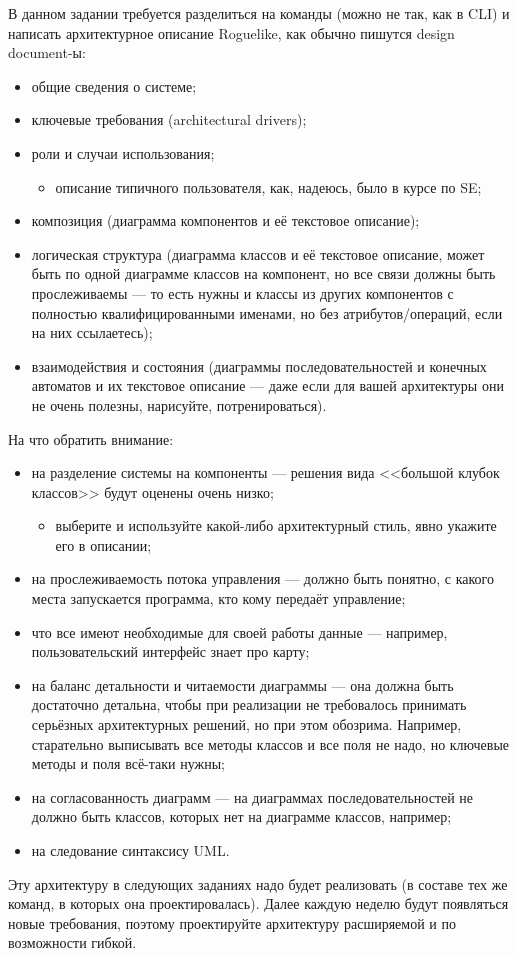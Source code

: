 \documentclass[a5paper]{homework}
\begin{document}
В данном задании требуется разделиться на команды (можно не так, как в CLI) и написать архитектурное описание Roguelike, как обычно пишутся design document-ы:

\begin{itemize}
    \item общие сведения о системе;
    \item ключевые требования (architectural drivers);
    \item роли и случаи использования;
    \begin{itemize}
        \item описание типичного пользователя, как, надеюсь, было в курсе по SE;
    \end{itemize}
    \item композиция (диаграмма компонентов и её текстовое описание);
    \item логическая структура (диаграмма классов и её текстовое описание, может быть по одной диаграмме классов на компонент, но все связи должны быть прослеживаемы --- то есть нужны и классы из других компонентов с полностью квалифицированными именами, но без атрибутов/операций, если на них ссылаетесь);
    \item взаимодействия и состояния (диаграммы последовательностей и конечных автоматов и их текстовое описание --- даже если для вашей архитектуры они не очень полезны, нарисуйте, потренироваться).
\end{itemize}

На что обратить внимание:

\begin{itemize}
    \item на разделение системы на компоненты --- решения вида <<большой клубок классов>> будут оценены очень низко;
    \begin{itemize}
        \item выберите и используйте какой-либо архитектурный стиль, явно укажите его в описании;
    \end{itemize}
    \item на прослеживаемость потока управления --- должно быть понятно, с какого места запускается программа, кто кому передаёт управление;
    \item что все имеют необходимые для своей работы данные --- например, пользовательский интерфейс знает про карту;
    \item на баланс детальности и читаемости диаграммы --- она должна быть достаточно детальна, чтобы при реализации не требовалось принимать серьёзных архитектурных решений, но при этом обозрима. Например, старательно выписывать все методы классов и все поля не надо, но ключевые методы и поля всё-таки нужны;
    \item на согласованность диаграмм --- на диаграммах последовательностей не должно быть классов, которых нет на диаграмме классов, например;
    \item на следование синтаксису UML.
\end{itemize}

Эту архитектуру в следующих заданиях надо будет реализовать (в составе тех же команд, в которых она проектировалась). Далее каждую неделю будут появляться новые требования, поэтому проектируйте архитектуру расширяемой и по возможности гибкой.
\end{document}
